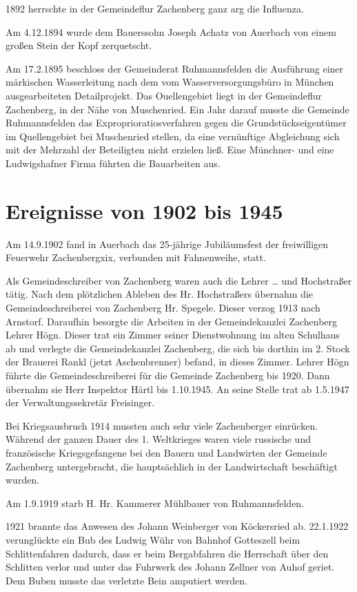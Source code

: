 \documentclass{book}
\begin{document}
1892 herrschte in der Gemeindeflur Zachenberg ganz arg die Influenza.

Am 4.12.1894 wurde dem Bauerssohn Joseph Achatz von Auerbach von einem großen
Stein der Kopf zerquetscht.

Am 17.2.1895 beschloss der Gemeinderat Ruhmannsfelden die Ausführung einer
märkischen Wasserleitung nach dem vom Wasserversorgungsbüro in München
ausgearbeiteten Detailprojekt. Das Ouellengebiet liegt in der Gemeindeflur
Zachenberg, in der Nähe von Muschenried. Ein Jahr darauf musste die Gemeinde
Ruhmannsfelden das Exproprioratiosverfahren gegen die Grundstückseigentümer im
Quellengebiet bei Muschenried stellen, da eine vernünftige Abgleichung sich mit
der Mehrzahl der Beteiligten nicht erzielen ließ. Eine Münchner- und eine
Ludwigshafner Firma führten die Bauarbeiten aus.

\section{Ereignisse von 1902 bis 1945}

Am 14.9.1902 fand in Auerbach das 25-jährige Jubiläumsfest der freiwilligen
Feuerwehr Zachenbergxix, verbunden mit Fahnenweihe, statt.

Als Gemeindeschreiber von Zachenberg waren auch die Lehrer … und Hochstraßer
tätig. Nach dem plötzlichen Ableben des Hr. Hochstraßers übernahm die
Gemeindeschreiberei von Zachenberg Hr. Spegele. Dieser verzog 1913 nach
Arnstorf. Daraufhin besorgte die Arbeiten in der Gemeindekanzlei Zachenberg
Lehrer Högn. Dieser trat ein Zimmer seiner Dienstwohnung im alten Schulhaus ab
und verlegte die Gemeindekanzlei Zachenberg, die sich bis dorthin im 2. Stock
der Brauerei Rankl (jetzt Aschenbrenner) befand, in dieses Zimmer. Lehrer Högn
führte die Gemeindeschreiberei für die Gemeinde Zachenberg bis 1920. Dann
übernahm sie Herr Inspektor Härtl bis 1.10.1945. An seine Stelle trat ab
1.5.1947 der Verwaltungssekretär Freisinger.

Bei Kriegsausbruch 1914 mussten auch sehr viele Zachenberger einrücken. Während
der ganzen Dauer des 1. Weltkrieges waren viele russische und französische
Kriegsgefangene bei den Bauern und Landwirten der Gemeinde Zachenberg
untergebracht, die hauptsächlich in der Landwirtschaft beschäftigt wurden.

Am 1.9.1919 starb H. Hr. Kammerer Mühlbauer von Ruhmannsfelden.

1921 brannte das Anwesen des Johann Weinberger von Köckersried ab. 22.1.1922
verunglückte ein Bub des Ludwig Wühr von Bahnhof Gotteszell beim Schlittenfahren
dadurch, dass er beim Bergabfahren die Herrschaft über den Schlitten verlor und
unter das Fuhrwerk des Johann Zellner von Auhof geriet. Dem Buben musste das
verletzte Bein amputiert werden.
\end{document}
